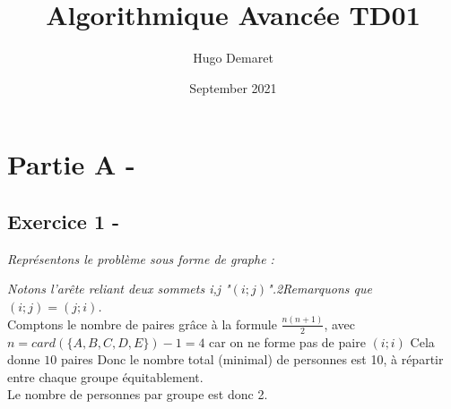 \documentclass{article}
\title{Algorithmique Avancée TD01}
\author{Hugo Demaret}
\date{September 2021}
\begin{document}
\maketitle
\section*{Partie A -}
\subsection*{Exercice 1 -}
\textit{Représentons le problème sous forme de graphe :}
	\begin{center}
	\end{center}
	\textit{Notons l'arête reliant deux sommets i,j "$(i;j)$".2Remarquons que $(i;j) = (j;i)$.}\\
	\linebreak
	\textsf{Comptons le nombre de paires grâce à la formule $\frac{n(n+1)}{2} $, avec $n = card(\{A,B,C,D,E\}) -1 = 4 $ car on ne forme pas de paire $(i;i)$}
	\linebreak
	\textsf{Cela donne $ 10$ paires}
	\textsf{Donc le nombre total (minimal) de personnes est 10, à répartir entre chaque groupe équitablement.}\\
	\textsf{Le nombre de personnes par groupe est donc 2.}
\end{document}
